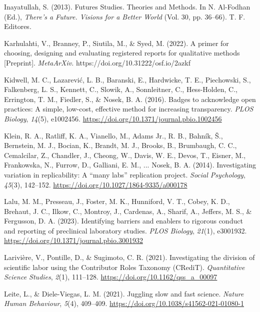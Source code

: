 \documentclass[authordate, meta]{jote-new-article}
\begin{document}
	Inayatullah, S. (2013). Futures Studies. Theories and Methods. In N. Al-Fodhan (Ed.), \emph{There's a Future. Visions for a Better World} (Vol. 30, pp. 36--66). T. F. Editores.



	Karhulahti, V., Branney, P., Siutila, M., \& Syed, M. (2022). A primer for choosing, designing and evaluating registered reports for qualitative methods [Preprint]. \emph{MetaArXiv. }https://doi.org/10.31222/osf.io/2azkf



	Kidwell, M. C., Lazarević, L. B., Baranski, E., Hardwicke, T. E., Piechowski, S., Falkenberg, L. S., Kennett, C., Slowik, A., Sonnleitner, C., Hess-Holden, C., Errington, T. M., Fiedler, S., \& Nosek, B. A. (2016). Badges to acknowledge open practices: A simple, low-cost, effective method for increasing transparency. \emph{PLOS Biology}, \emph{14}(5), e1002456. \url{https://doi.org/10.1371/journal.pbio.1002456}



	Klein, R. A., Ratliff, K. A., Vianello, M., Adams Jr., R. B., Bahník, Š., Bernstein, M. J., Bocian, K., Brandt, M. J., Brooks, B., Brumbaugh, C. C., Cemalcilar, Z., Chandler, J., Cheong, W., Davis, W. E., Devos, T., Eisner, M., Frankowska, N., Furrow, D., Galliani, E. M., ... Nosek, B. A. (2014). Investigating variation in replicability: A “many labs” replication project. \emph{Social Psychology}, \emph{45}(3), 142--152. \url{https://doi.org/10.1027/1864-9335/a000178}



	Lalu, M. M., Presseau, J., Foster, M. K., Hunniford, V. T., Cobey, K. D., Brehaut, J. C., Ilkow, C., Montroy, J., Cardenas, A., Sharif, A., Jeffers, M. S., \& Fergusson, D. A. (2023). Identifying barriers and enablers to rigorous conduct and reporting of preclinical laboratory studies. \emph{PLOS Biology}, \emph{21}(1), e3001932. \url{https://doi.org/10.1371/journal.pbio.3001932}



	Larivière, V., Pontille, D., \& Sugimoto, C. R. (2021). Investigating the division of scientific labor using the Contributor Roles Taxonomy (CRediT). \emph{Quantitative Science Studies}, \emph{2}(1), 111--128. \url{https://doi.org/10.1162/qss\_a\_00097}



	Leite, L., \& Diele-Viegas, L. M. (2021). Juggling slow and fast science. \emph{Nature Human Behaviour}, \emph{5}(4), 409--409. \url{https://doi.org/10.1038/s41562-021-01080-1}
\end{document}
